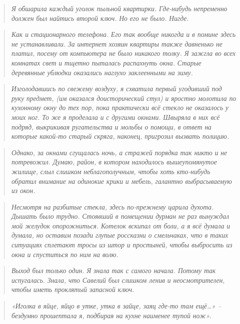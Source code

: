 \documentclass[
  a5paperpaper,
  DIV=11,
  numbers=noendperiod]{scrreprt}
\begin{document}
\begin{quote}
\emph{Я обшарила каждый уголок пыльной квартирки. Где-нибудь непременно
должен был найтись второй ключ. Но его не было. Нигде.}
\end{quote}

\begin{quote}
\emph{Как и стационарного телефона. Его так вообще никогда и в помине
здесь не устанавливали. За интернет хозяин квартиры также давненько не
платил, посему от компьютера не было никакого толку. Я зажгла во всех
комнатах свет и тщетно пыталась распахнуть окна. Старые деревянные
ублюдки оказались наглухо заклеенными на зиму.}
\end{quote}

\begin{quote}
\emph{Изголодавшись по свежему воздуху, я схватила первый угодивший под
руку предмет, (им оказался доисторический стул) и яростно молотила по
кухонному окну до тех пор, пока практически всё стекло не оказалось у
моих ног. То же я проделала и с другими окнами. Швыряла в них всё
подряд, выкрикивая ругательства и мольбы о помощи, в ответ на которые
какой-то старый скряга, наконец, пригрозил вызвать полицию.}
\end{quote}

\begin{quote}
\emph{Однако, за окнами сгущалась ночь, а стражей порядка так никто и не
потревожил. Думаю, район, в котором находилось вышеупомянутое жилище,
слыл слишком неблагополучным, чтобы хоть кто-нибудь обратил внимание на
одинокие крики и мебель, галантно выбрасываемую из окон.}
\end{quote}

\begin{quote}
\emph{Несмотря на разбитые стекла, здесь по-прежнему царила духота.
Дышать было трудно. Стоявший в помещении дурман не раз вынуждал мой
желудок опорожниться. Котелок вскипал от боли, а я всё думала и думала,
но оставим позади глупые россказни о смельчаках, что в таких ситуациях
сплетают тросы из штор и простыней, чтобы выбросить из окна и спуститься
по ним на волю.}
\end{quote}

\begin{quote}
\emph{Выход был только один. Я знала так с самого начала. Потому так
испугалась. Знала, что Савелий был слишком ленив и неосмотрителен, чтобы
иметь проклятый запасной ключ.}
\end{quote}

\begin{quote}
\emph{«Иголка в яйце, яйцо в утке, утка в зайце, заяц где-то там
ещё\ldots» -- бездумно прошептала я, подбирая на кухне наименее тупой
нож».}
\end{quote}
\end{document}
